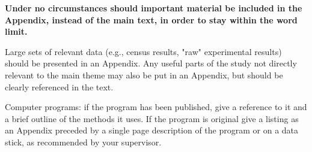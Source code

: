\documentclass[a4paper,12pt]{article}
\begin{document}
\textbf{Under no circumstances should important material be included in the Appendix, instead of the
  main text, in order to stay within the word limit.}

Large sets of relevant data (e.g., census results, "raw" experimental results) should be presented in an Appendix. Any useful parts of the study not directly relevant to the main theme may also be put in an Appendix, but should be clearly referenced in the text. 

Computer programs: if the program has been published, give a reference to it and a brief outline of the methods it uses. If the program is original give a listing as an Appendix preceded by a single page description of the program or on a data stick, as recommended by your supervisor.
\end{document}
